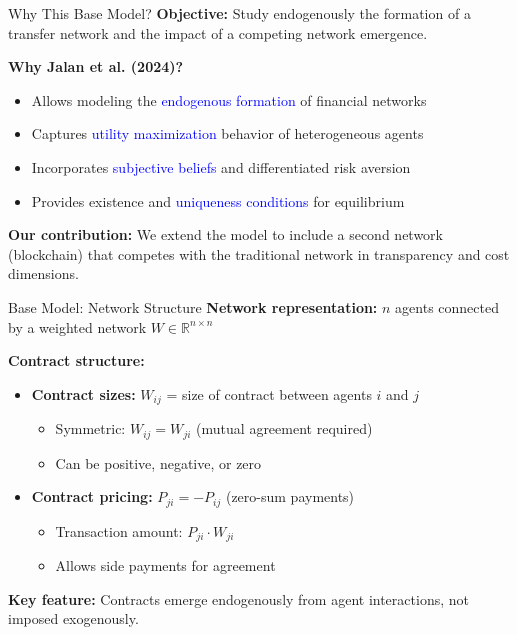 \documentclass{beamer}
\begin{document}
\begin{frame}{Why This Base Model?}
\textbf{Objective:} Study endogenously the formation of a transfer network and the impact of a competing network emergence.

\vspace{0.5cm}
\textbf{Why Jalan et al. (2024)?}
\begin{itemize}
    \item Allows modeling the \textcolor{blue}{endogenous formation} of financial networks
    \item Captures \textcolor{blue}{utility maximization} behavior of heterogeneous agents
    \item Incorporates \textcolor{blue}{subjective beliefs} and differentiated risk aversion
    \item Provides existence and \textcolor{blue}{uniqueness conditions} for equilibrium
\end{itemize}

\vspace{0.3cm}
\textbf{Our contribution:} We extend the model to include a second network (blockchain) that competes with the traditional network in transparency and cost dimensions.
\end{frame}

\begin{frame}{Base Model: Network Structure}
\textbf{Network representation:} $n$ agents connected by a weighted network $W\in\mathbb{R}^{n\times n}$

\vspace{0.3cm}
\textbf{Contract structure:}
\begin{itemize}
    \item \textbf{Contract sizes:} $W_{ij}$ = size of contract between agents $i$ and $j$
    \begin{itemize}
        \item Symmetric: $W_{ij} = W_{ji}$ (mutual agreement required)
        \item Can be positive, negative, or zero
    \end{itemize}
    
    \item \textbf{Contract pricing:} $P_{ji} = -P_{ij}$ (zero-sum payments)
    \begin{itemize}
        \item Transaction amount: $P_{ji} \cdot W_{ji}$
        \item Allows side payments for agreement
    \end{itemize}
\end{itemize}

\vspace{0.3cm}
\textbf{Key feature:} Contracts emerge endogenously from agent interactions, not imposed exogenously.
\end{frame}
\end{document}
